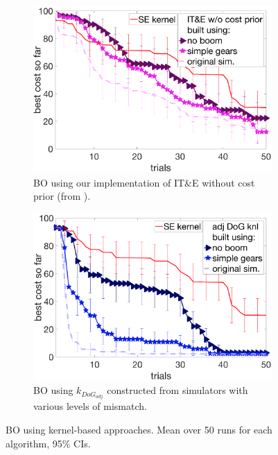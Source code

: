 \begin{figure}[t]
\begin{subfigure}[t]{0.47\textwidth}
\centering
\includegraphics[width=1.0\textwidth]{img/cully_no_prior_sim_versions.png}
\caption{\small{BO using our implementation of IT\&E without cost prior (from \citet{cully2015robots}).}}
\label{fig:cully_kernel_sim_versions}
\end{subfigure}
\hspace{10px}
\begin{subfigure}[t]{0.47\textwidth}
\centering
\includegraphics[width=1.0\textwidth]{img/dog_hwadjust1_sim_versions.png}
\caption{\small{BO using $k_{DoG_{adj}}$ constructed from simulators with various levels of mismatch.}}
\label{fig:kernel_hwadjust2_sim_versions}
\end{subfigure}
\caption{\small{BO using kernel-based approaches. Mean over 50 runs for each algorithm, 95\% CIs.}}
\label{fig:prior_based_bo}
\end{figure}


